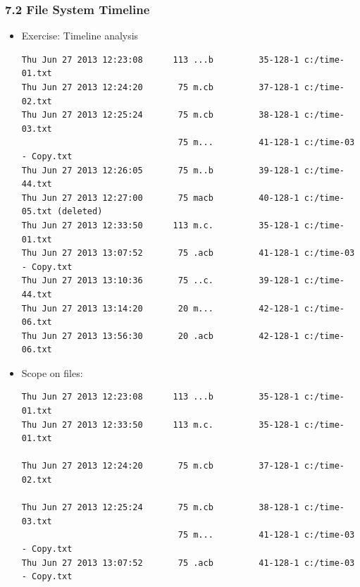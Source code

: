 \begin{frame}[fragile]
  \frametitle{7.2 File System Timeline}
    \begin{itemize}
        \item[] Exercise: Timeline analysis
  \begin{lstlisting}[basicstyle=\tiny]
Thu Jun 27 2013 12:23:08      113 ...b         35-128-1 c:/time-01.txt
Thu Jun 27 2013 12:24:20       75 m.cb         37-128-1 c:/time-02.txt
Thu Jun 27 2013 12:25:24       75 m.cb         38-128-1 c:/time-03.txt
                               75 m...         41-128-1 c:/time-03 - Copy.txt
Thu Jun 27 2013 12:26:05       75 m..b         39-128-1 c:/time-44.txt
Thu Jun 27 2013 12:27:00       75 macb         40-128-1 c:/time-05.txt (deleted)
Thu Jun 27 2013 12:33:50      113 m.c.         35-128-1 c:/time-01.txt
Thu Jun 27 2013 13:07:52       75 .acb         41-128-1 c:/time-03 - Copy.txt
Thu Jun 27 2013 13:10:36       75 ..c.         39-128-1 c:/time-44.txt
Thu Jun 27 2013 13:14:20       20 m...         42-128-1 c:/time-06.txt
Thu Jun 27 2013 13:56:30       20 .acb         42-128-1 c:/time-06.txt
  \end{lstlisting}
        \item[] Scope on files:
  \begin{lstlisting}[basicstyle=\tiny]
Thu Jun 27 2013 12:23:08      113 ...b         35-128-1 c:/time-01.txt
Thu Jun 27 2013 12:33:50      113 m.c.         35-128-1 c:/time-01.txt

Thu Jun 27 2013 12:24:20       75 m.cb         37-128-1 c:/time-02.txt

Thu Jun 27 2013 12:25:24       75 m.cb         38-128-1 c:/time-03.txt
                               75 m...         41-128-1 c:/time-03 - Copy.txt
Thu Jun 27 2013 13:07:52       75 .acb         41-128-1 c:/time-03 - Copy.txt
  \end{lstlisting}
    \end{itemize}
\end{frame}


